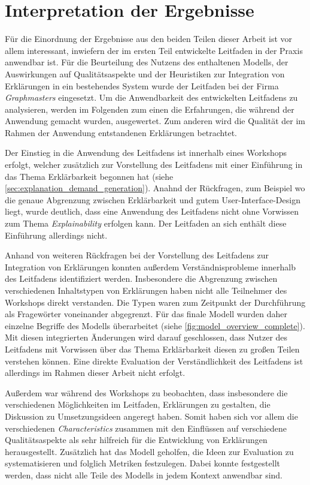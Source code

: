 \section{Interpretation der Ergebnisse}

Für die Einordnung der Ergebnisse aus den beiden Teilen dieser Arbeit ist vor allem interessant, inwiefern der im ersten Teil entwickelte Leitfaden in der Praxis anwendbar ist. Für die Beurteilung des Nutzens des enthaltenen Modells, der Auswirkungen auf Qualitätsaspekte und der Heuristiken zur Integration von Erklärungen in ein bestehendes System wurde der Leitfaden bei der Firma \textit{Graphmasters} eingesetzt. Um die Anwendbarkeit des entwickelten Leitfadens zu analysieren, werden im Folgenden zum einen die Erfahrungen, die während der Anwendung gemacht wurden, ausgewertet. Zum anderen wird die Qualität der im Rahmen der Anwendung entstandenen Erklärungen betrachtet.

Der Einstieg in die Anwendung des Leitfadens ist innerhalb eines Workshops erfolgt, welcher zusätzlich zur Vorstellung des Leitfadens mit einer Einführung in das Thema Erklärbarkeit begonnen hat (siehe \autoref{sec:explanation_demand_generation}). Anahnd der Rückfragen, zum Beispiel wo die genaue Abgrenzung zwischen Erklärbarkeit und gutem User-Interface-Design liegt, wurde deutlich, dass eine Anwendung des Leitfadens nicht ohne Vorwissen zum Thema \textit{Explainability} erfolgen kann. Der Leitfaden an sich enthält diese Einführung allerdings nicht.

Anhand von weiteren Rückfragen bei der Vorstellung des Leitfadens zur Integration von Erklärungen konnten außerdem Verständnisprobleme innerhalb des Leitfadens identifiziert werden. Insbesondere die Abgrenzung zwischen verschiedenen Inhaltstypen von Erklärungen haben nicht alle Teilnehmer des Workshops direkt verstanden. Die Typen waren zum Zeitpunkt der Durchführung als Fragewörter voneinander abgegrenzt. Für das finale Modell wurden daher einzelne Begriffe des Modells überarbeitet (siehe \autoref{fig:model_overview_complete}). Mit diesen integrierten Änderungen wird darauf geschlossen, dass Nutzer des Leitfadens mit Vorwissen über das Thema Erklärbarkeit diesen zu großen Teilen verstehen können. Eine direkte Evaluation der Verständlichkeit des Leitfadens ist allerdings im Rahmen dieser Arbeit nicht erfolgt.

Außerdem war während des Workshops zu beobachten, dass insbesondere die verschiedenen Möglichkeiten im Leitfaden, Erklärungen zu gestalten, die Diskussion zu Umsetzungsideen angeregt haben. Somit haben sich vor allem die verschiedenen \textit{Characteristics} zusammen mit den Einflüssen auf verschiedene Qualitätsaspekte als sehr hilfreich für die Entwicklung von Erklärungen herausgestellt. Zusätzlich hat das Modell geholfen, die Ideen zur Evaluation zu systematisieren und folglich Metriken festzulegen. Dabei konnte festgestellt werden, dass nicht alle Teile des Modells in jedem Kontext anwendbar sind.

